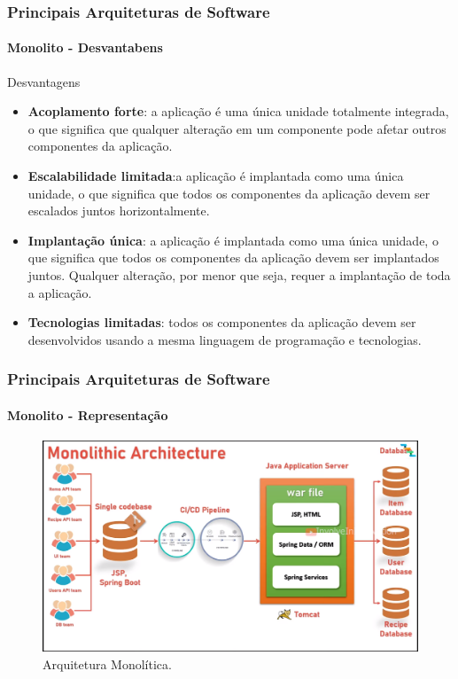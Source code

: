 \documentclass[
	10pt, %
	t, %
]{beamer}
\begin{document}
\begin{frame}
	\frametitle{Principais Arquiteturas de Software}
	\framesubtitle{Monolito - Desvantabens}

	\begin{alertblock}{Desvantagens}
		\begin{itemize}
			\item \textbf{Acoplamento forte}: a aplicação é uma única unidade totalmente integrada, o que significa que qualquer alteração em um componente pode afetar outros componentes da aplicação.
			\item \textbf{Escalabilidade limitada}:a aplicação é implantada como uma única unidade, o que significa que todos os componentes da aplicação devem ser escalados juntos horizontalmente.
			\item \textbf{Implantação única}: a aplicação é implantada como uma única unidade, o que significa que todos os componentes da aplicação devem ser implantados juntos. Qualquer alteração, por menor que seja, requer a implantação de toda a aplicação.
			\item \textbf{Tecnologias limitadas}: todos os componentes da aplicação devem ser desenvolvidos usando a mesma linguagem de programação e tecnologias.
		\end{itemize}
	\end{alertblock}

\end{frame}

\begin{frame}
	\frametitle{Principais Arquiteturas de Software}
	\framesubtitle{Monolito - Representação}
	
	\begin{figure}
		\centering
		\includegraphics[width=0.9\linewidth]{Images/monolito2.png}
		\caption{Arquitetura Monolítica.}\label{fig:monolito}
	\end{figure}

\end{frame}
\end{document}
